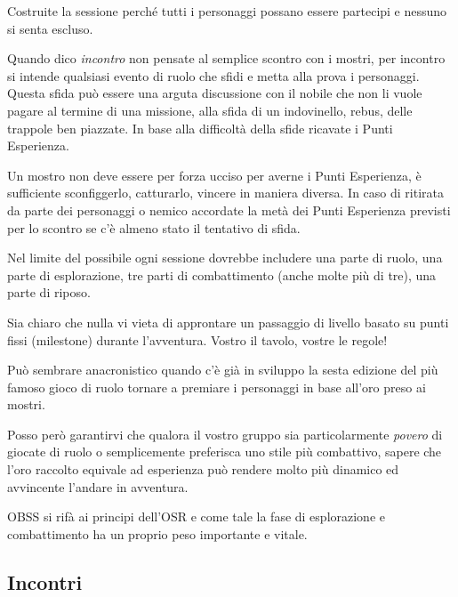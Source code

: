 \begin{multicols}{2}
Costruite la sessione perché tutti i personaggi possano essere partecipi e nessuno si senta escluso.



Quando dico \emph{incontro} non pensate al semplice scontro con i mostri, per incontro si intende qualsiasi evento di ruolo che sfidi e metta alla prova i personaggi. Questa sfida può essere una arguta discussione con il nobile che non li vuole pagare al termine di una missione, alla sfida di un indovinello, rebus, delle trappole ben piazzate. In base alla difficoltà della sfide ricavate i Punti Esperienza.

Un mostro non deve essere per forza ucciso per averne i Punti Esperienza, è sufficiente sconfiggerlo, catturarlo, vincere in maniera diversa. In caso di ritirata da parte dei personaggi o nemico accordate la metà dei Punti Esperienza previsti per lo scontro se c'è almeno stato il tentativo di sfida.

Nel limite del possibile ogni sessione dovrebbe includere una parte di ruolo, una parte di esplorazione, tre parti di combattimento (anche molte più di tre), una parte di riposo.

\medskip

\begin{narratore}
Sia chiaro che nulla vi vieta di approntare un passaggio di livello basato su punti fissi (milestone) durante l'avventura. Vostro il tavolo, vostre le regole!

\medskip

Può sembrare anacronistico quando c'è già in sviluppo la sesta edizione del più famoso gioco di ruolo tornare a premiare i personaggi in base all'oro preso ai mostri.

Posso però garantirvi che qualora il vostro gruppo sia particolarmente \emph{povero} di giocate di ruolo o semplicemente preferisca uno stile più combattivo, sapere che l'oro raccolto equivale ad esperienza può rendere molto più dinamico ed avvincente l'andare in avventura.

OBSS si rifà ai principi dell'OSR e come tale la fase di esplorazione e combattimento ha un proprio peso importante e vitale.
\end{narratore}

\subsection{Incontri}\label{incontri}


\end{multicols}
